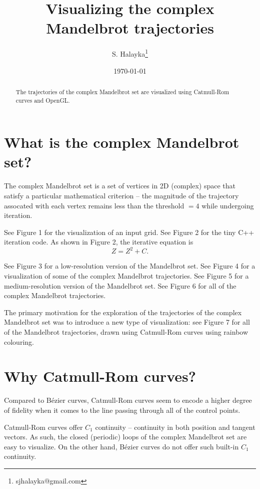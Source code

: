 \documentclass[12pt]{article}
\title{Visualizing the complex Mandelbrot trajectories}
\author{S. Halayka\footnote{sjhalayka@gmail.com}}
\date{\today}
\begin{document}
\maketitle

\begin{abstract}
The trajectories of the complex Mandelbrot set are visualized using Catmull-Rom curves and OpenGL.
\end{abstract}



\section{What is the complex Mandelbrot set?}

The complex Mandelbrot set is a set of vertices in 2D (complex) space that satisfy a particular mathematical criterion -- the magnitude of the trajectory assocated with each vertex remains less than the threshold $= 4$ while undergoing iteration.

See Figure 1 for the visualization of an input grid.
See Figure 2 for the tiny C++ iteration code.
As shown in Figure 2, the iterative equation is
\begin{equation}
Z = Z^2 + C.
\end{equation}

See Figure 3 for a low-resolution version of the Mandelbrot set.
See Figure 4 for a visualization of some of the complex Mandelbrot trajectories.
See Figure 5 for a medium-resolution version of the Mandelbrot set.
See Figure 6 for all of the complex Mandelbrot trajectories.

The primary motivation for the exploration of the trajectories of the complex Mandelbrot set was to introduce a new type of visualization: see Figure 7 for all of the Mandelbrot trajectories, drawn using Catmull-Rom curves using rainbow colouring.


\section{Why Catmull-Rom curves?}

Compared to  B\'ezier curves, Catmull-Rom curves seem to encode a higher degree of fidelity when it comes to the line passing through all of the control points.

Catmull-Rom curves offer $C_1$ continuity -- continuity in both position and tangent vectors.
As such, the closed (periodic) loops of the complex Mandelbrot set are easy to visualize.
On the other hand, B\'ezier curves do not offer such built-in $C_1$ continuity.
\end{document}
